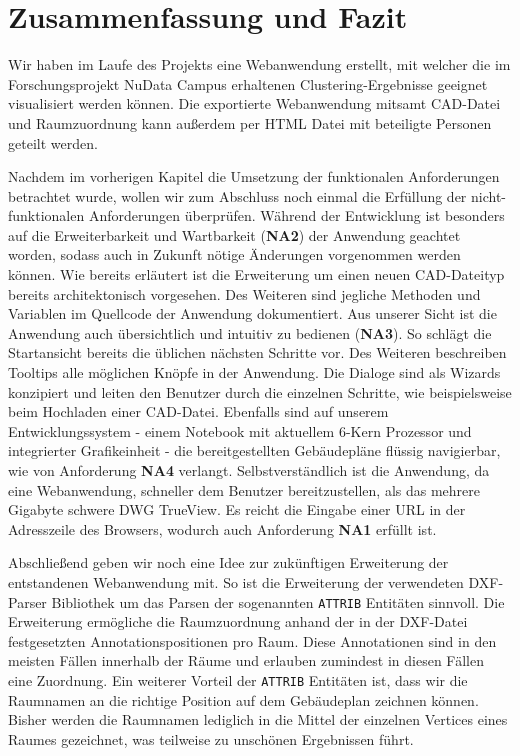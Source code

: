 \section{Zusammenfassung und Fazit}
\label{sec:summary}

Wir haben im Laufe des Projekts eine Webanwendung erstellt, mit welcher die im Forschungsprojekt \glqq{}NuData Campus\grqq{} erhaltenen Clustering-Ergebnisse geeignet visualisiert werden können.
Die exportierte Webanwendung mitsamt CAD-Datei und Raumzuordnung kann außerdem per HTML Datei mit beteiligte Personen geteilt werden.

Nachdem im vorherigen Kapitel die Umsetzung der funktionalen Anforderungen betrachtet wurde, wollen wir zum Abschluss noch einmal die Erfüllung der nicht-funktionalen Anforderungen überprüfen.
Während der Entwicklung ist besonders auf die Erweiterbarkeit und Wartbarkeit (\textbf{NA2}) der Anwendung geachtet worden, sodass auch in Zukunft nötige Änderungen vorgenommen werden können.
Wie bereits erläutert ist die Erweiterung um einen neuen CAD-Dateityp bereits architektonisch vorgesehen.
Des Weiteren sind jegliche Methoden und Variablen im Quellcode der Anwendung dokumentiert.
Aus unserer Sicht ist die Anwendung auch übersichtlich und intuitiv zu bedienen (\textbf{NA3}).
So schlägt die Startansicht bereits die üblichen nächsten Schritte vor.
Des Weiteren beschreiben Tooltips alle möglichen Knöpfe in der Anwendung.
Die Dialoge sind als Wizards konzipiert und leiten den Benutzer durch die einzelnen Schritte, wie beispielsweise beim Hochladen einer CAD-Datei.
Ebenfalls sind auf unserem Entwicklungssystem - einem Notebook mit aktuellem 6-Kern Prozessor und integrierter Grafikeinheit - die bereitgestellten Gebäudepläne flüssig navigierbar, wie von Anforderung \textbf{NA4} verlangt.
Selbstverständlich ist die Anwendung, da eine Webanwendung, schneller dem Benutzer bereitzustellen, als das mehrere Gigabyte schwere DWG TrueView.
Es reicht die Eingabe einer URL in der Adresszeile des Browsers, wodurch auch Anforderung \textbf{NA1} erfüllt ist.

Abschließend geben wir noch eine Idee zur zukünftigen Erweiterung der entstandenen Webanwendung mit.
So ist die Erweiterung der verwendeten DXF-Parser Bibliothek um das Parsen der sogenannten \texttt{ATTRIB} Entitäten sinnvoll.
Die Erweiterung ermögliche die Raumzuordnung anhand der in der DXF-Datei festgesetzten Annotationspositionen pro Raum.
Diese Annotationen sind in den meisten Fällen innerhalb der Räume und erlauben zumindest in diesen Fällen eine Zuordnung.
Ein weiterer Vorteil der \texttt{ATTRIB} Entitäten ist, dass wir die Raumnamen an die richtige Position auf dem Gebäudeplan zeichnen können.
Bisher werden die Raumnamen lediglich in die Mittel der einzelnen Vertices eines Raumes gezeichnet, was teilweise zu unschönen Ergebnissen führt.

